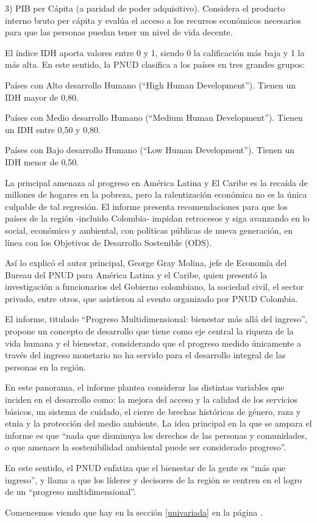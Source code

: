 \documentclass{article}
\begin{document}
3) PIB per Cápita (a paridad de poder adquisitivo). Considera el producto interno bruto per cápita y evalúa el acceso a los recursos económicos necesarios para que las personas puedan tener un nivel de vida decente.

El índice IDH aporta valores entre 0 y 1,  siendo 0 la calificación más baja y 1 la más alta. En este sentido, la PNUD clasifica a los países en tres grandes grupos:

Países con Alto desarrollo Humano (“High Human Development”).  Tienen un IDH mayor de 0,80. 

Países con Medio desarrollo Humano (“Medium Human Development”). Tienen un IDH entre 0,50 y 0,80.

Países con Bajo desarrollo Humano (“Low Human Development”). Tienen un IDH menor de 0,50.

La principal amenaza al progreso en América Latina y El Caribe es la recaída de millones de hogares en la pobreza, pero la ralentización económica no es la única culpable de tal regresión. El informe presenta recomendaciones para que los países de la región -incluido Colombia- impidan retrocesos y siga avanzando en lo social, económico y ambiental, con políticas públicas de nueva generación, en línea con los Objetivos de Desarrollo Sostenible (ODS).

Así lo explicó el autor principal, George Gray Molina, jefe de Economía del Bureau del PNUD para América Latina y el Caribe, quien presentó la investigación a funcionarios del Gobierno colombiano, la sociedad civil, el sector privado, entre otros, que asistieron al evento organizado por PNUD Colombia.

El informe, titulado “Progreso Multidimensional: bienestar más allá del ingreso”, propone un concepto de desarrollo que tiene como eje central la riqueza de la vida humana y el bienestar, considerando que el progreso medido únicamente a través del ingreso monetario no ha servido para el desarrollo integral de las personas en la región. 

En este panorama, el informe plantea considerar las distintas variables que inciden en el desarrollo como: la mejora del acceso y la calidad de los servicios básicos, un sistema de cuidado, el cierre de brechas históricas de género, raza y etnia y la protección del medio ambiente. La idea principal en la que se ampara el informe es que “nada que disminuya los derechos de las personas y comunidades, o que amenace la sostenibilidad ambiental puede ser considerado progreso”. 

En este sentido, el PNUD enfatiza que el bienestar de la gente es “más que ingreso”, y llama a que los líderes y decisores de la región se centren en el logro de un “progreso multidimensional”.


Comencemos viendo que hay en la sección \ref{univariada} en la página \pageref{univariada}.

\clearpage







\renewcommand{\refname}{Bibliografia}

\end{document}
